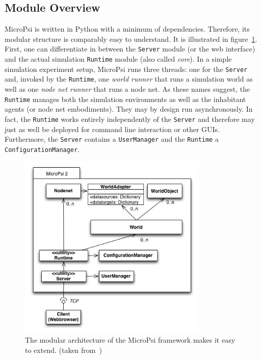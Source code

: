         \subsection{Module Overview}
        
    

        
MicroPsi is written in Python with a minimum of dependencies. Therefore, its  modular structure is comparably easy to understand. It is illustrated in figure~\ref{micropsi2_modules}. First, one can differentiate in between the \texttt{Server} module (or the web interface) and the actual simulation \texttt{Runtime} module (also called \emph{core}). In a simple simulation experiment setup, MicroPsi runs three threads: one for the \texttt{Server} and, invoked by the \texttt{Runtime}, one \emph{world runner} that runs a simulation world as well as one \emph{node net runner} that runs a node net. As these names suggest, the \texttt{Runtime} manages both the simulation environments as well as the inhabitant agents (or node net embodiments). They may by design run asynchronously. In fact, the \texttt{Runtime} works entirely independently of the \texttt{Server} and therefore may just as well be deployed for command line interaction or other GUIs. Furthermore, the \texttt{Server} contains a \texttt{UserManager} and the \texttt{Runtime} a \texttt{ConfigurationManager}.~\cite{conf/agi/Bach12}
          
\begin{figure}[h]
  \centering
    \includegraphics[width=9cm]{graphics/UML_MicroPsi_v14}
  \caption{The modular architecture of the MicroPsi framework makes it easy to extend. (taken from~\cite{conf/agi/Bach12})}
  \label{micropsi2_modules}
\end{figure}

